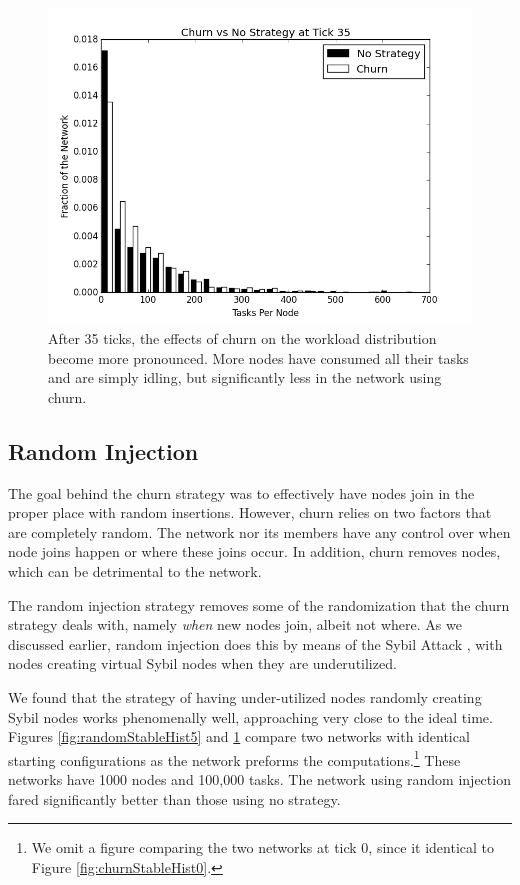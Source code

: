 \documentclass[11pt,letterpaper]{article}
\begin{document}
{	\begin{figure}
		\centering
		\includegraphics[width=0.7\linewidth]{figs/ChurnStableHist35}
		\caption[Workload for churn at tick 35]{After 35 ticks, the effects of churn on the workload distribution become more pronounced.  More nodes have consumed all their tasks and are simply idling, but significantly less in the network using churn.}
		\label{fig:churnStableHist35}
	\end{figure}
	
	\subsection{Random Injection}
	
	The goal behind the churn strategy was to effectively have nodes join in the proper place with random insertions.
	However, churn relies on two factors that are completely random.
	The network nor its members have any control over when node joins happen or where these joins occur.
	In addition, churn removes nodes, which can be detrimental to the network.
	
	The random injection strategy removes some of the randomization that the churn strategy deals with, namely \textit{when} new nodes join, albeit not where.
	As we discussed earlier, random injection does this by means of the Sybil Attack \cite{sybil}, with nodes creating virtual Sybil nodes when they are underutilized.
	
	We found that the strategy of having under-utilized nodes randomly creating Sybil nodes works phenomenally well, approaching very close to the ideal time.
	Figures \ref{fig:randomStableHist5} and \ref{fig:churnStableHist35} compare two networks with identical starting configurations as the network preforms the computations.\footnote{We omit a figure comparing the two networks at tick 0, since it identical to Figure \ref{fig:churnStableHist0}.}
	These networks have 1000 nodes and 100,000 tasks.  
	The network using random injection fared significantly better than those using no strategy.
	
}
\end{document}
